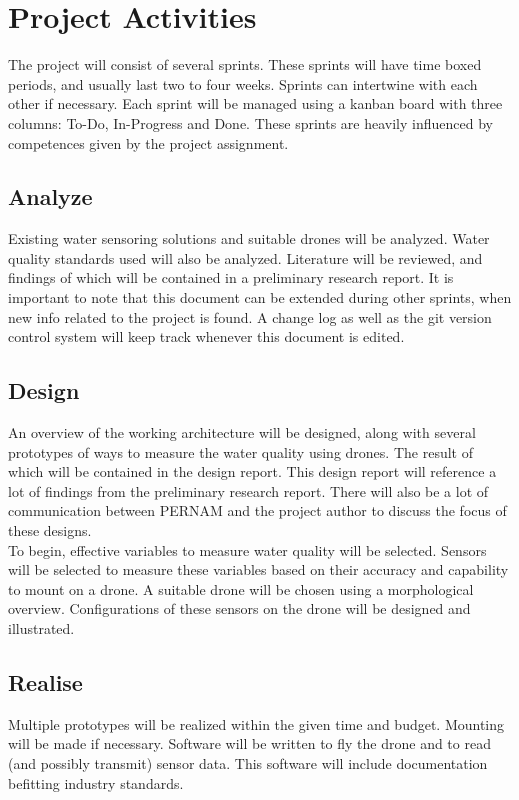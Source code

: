 \documentclass[11pt, a4paper]{article}
\begin{document}
\section{Project Activities} \label{projectactivities}
The project will consist of several sprints. These sprints will have time boxed periods, and usually last two to four weeks. Sprints can intertwine with each other if necessary. Each sprint will be managed using a kanban \cite{kanban} board with three columns: To-Do, In-Progress and Done. These sprints are heavily influenced by competences given by the project assignment. \cite{assignmentform}

\subsection{Analyze} \label{sprint:analyze}
Existing water sensoring solutions and suitable drones will be analyzed. Water quality standards used will also be analyzed. Literature will be reviewed, and findings of which will be contained in a preliminary research report.  It is important to note that this document can be extended during other sprints, when new info related to the project is found. A change log as well as the git version control system \cite{git} will keep track whenever this document is edited.

\subsection{Design} \label{sprint:design}
An overview of the working architecture will be designed, along with several prototypes of ways to measure the water quality using drones. The result of which will be contained in the design report. This design report will reference a lot of findings from the preliminary research report. There will also be a lot of communication between PERNAM and the project author to discuss the focus of these designs. \\

To begin, effective variables to measure water quality will be selected. Sensors will be selected to measure these variables based on their accuracy and capability to mount on a drone. A suitable drone will be chosen using a morphological overview. Configurations of these sensors on the drone will be designed and illustrated. 

\subsection{Realise} \label{sprint:realise}
Multiple prototypes will be realized within the given time and budget. Mounting will be made if necessary. Software will be written to fly the drone and to read (and possibly transmit) sensor data. This software will include documentation befitting industry standards.\\
\end{document}
